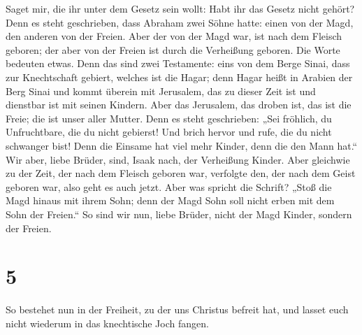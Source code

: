  Saget mir, die ihr unter dem Gesetz sein wollt: Habt ihr
das Gesetz nicht gehört?  Denn es steht geschrieben, dass
Abraham zwei Söhne hatte: einen von der Magd, den anderen von der
Freien.  Aber der von der Magd war, ist nach dem Fleisch
geboren; der aber von der Freien ist durch die Verheißung geboren.
 Die Worte bedeuten etwas. Denn das sind zwei Testamente:
eins von dem Berge Sinai, dass zur Knechtschaft gebiert, welches ist die
Hagar;  denn Hagar heißt in Arabien der Berg Sinai und
kommt überein mit Jerusalem, das zu dieser Zeit ist und dienstbar ist
mit seinen Kindern.  Aber das Jerusalem, das droben ist,
das ist die Freie; die ist unser aller Mutter.  Denn es
steht geschrieben: „Sei fröhlich, du Unfruchtbare, die du nicht
gebierst! Und brich hervor und rufe, die du nicht schwanger bist! Denn
die Einsame hat viel mehr Kinder, denn die den Mann hat.``
 Wir aber, liebe Brüder, sind, Isaak nach, der Verheißung
Kinder.  Aber gleichwie zu der Zeit, der nach dem Fleisch
geboren war, verfolgte den, der nach dem Geist geboren war, also geht es
auch jetzt.  Aber was spricht die Schrift? „Stoß die Magd
hinaus mit ihrem Sohn; denn der Magd Sohn soll nicht erben mit dem Sohn
der Freien.``  So sind wir nun, liebe Brüder, nicht der
Magd Kinder, sondern der Freien.

\hypertarget{section-4}{%
\section{5}\label{section-4}}

 So bestehet nun in der Freiheit, zu der uns Christus
befreit hat, und lasset euch nicht wiederum in das knechtische Joch
fangen.

